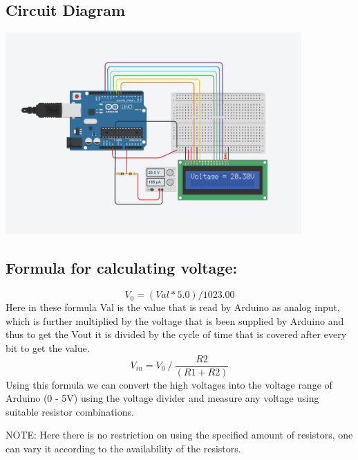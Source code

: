 \subsection{Circuit Diagram}
            \begin{center}
            \includegraphics[width =0.85\textwidth]{images/measure_analog_voltage.png}
            \end{center}


\subsection{Formula for calculating voltage:}

\begin{equation}
    V_0 = (Val * 5.0) / 1023.00
\end{equation}
Here in these formula Val is the value that is read by Arduino as analog input, which is further multiplied by the voltage that is been supplied by Arduino and thus to get the Vout it is divided by the cycle of time that is covered after every bit to get the value.
\begin{equation}
    V_{in} = {V_{0}}~/~\frac{R2}{(R1+R2)}
\end{equation}
Using this formula we can convert the high voltages into the voltage range of Arduino (0 - 5V) using the voltage divider and measure any voltage using suitable resistor combinations. 

NOTE: Here there is no restriction on using the specified amount of resistors, one can vary it according to the availability of the resistors.


